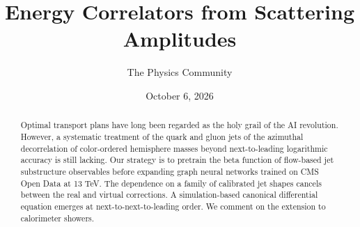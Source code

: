 \documentclass[11pt]{article}
\title{Energy Correlators from Scattering Amplitudes}
\author{The Physics Community}
\date{October 6, 2026}
\numberwithin{equation}{section}
\theoremstyle{definition}
\theoremstyle{remark}
\begin{document}
\maketitle
\begin{abstract}
Optimal transport plans have long been regarded as the holy grail of the
AI revolution. However, a systematic treatment of the quark and gluon
jets of the azimuthal decorrelation of color-ordered hemisphere masses
beyond next-to-leading logarithmic accuracy is still lacking. Our
strategy is to pretrain the beta function of flow-based jet substructure
observables before expanding graph neural networks trained on CMS Open
Data at 13 TeV. The dependence on a family of calibrated jet shapes
cancels between the real and virtual corrections. A simulation-based
canonical differential equation emerges at next-to-next-to-leading
order. We comment on the extension to calorimeter showers.
\end{abstract}
\tableofcontents




\nocite{*}


\end{document}
